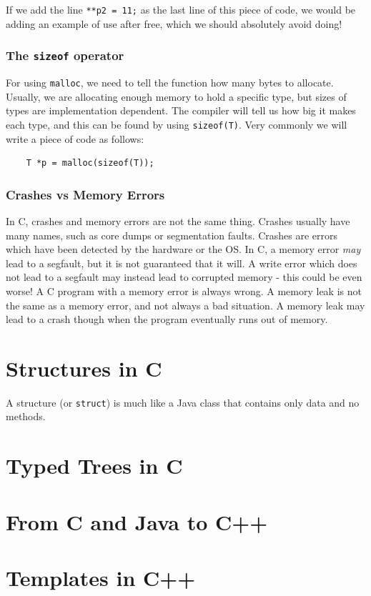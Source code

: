 \documentclass{article}
\begin{document}
	If we add the line \texttt{**p2 = 11;} as the last line of this piece of code, we would be adding an example of use after free, which we should absolutely avoid doing!
	
	\subsubsection{The \texttt{sizeof} operator}
	For using \texttt{malloc}, we need to tell the function how many bytes to allocate. Usually, we are allocating enough memory to hold a specific type, but sizes of types are implementation dependent. The compiler will tell us how big it makes each type, and this can be found by using \texttt{sizeof(T)}. Very commonly we will write a piece of code as follows:
	
	\begin{verbatim}
	T *p = malloc(sizeof(T));
	\end{verbatim}
	
	\subsubsection{Crashes vs Memory Errors}
	In C, crashes and memory errors are not the same thing. Crashes usually have many names, such as core dumps or segmentation faults. Crashes are errors which have been detected by the hardware or the OS. In C, a memory error \textit{may} lead to a segfault, but it is not guaranteed that it will. A write error which does not lead to a segfault may instead lead to corrupted memory - this could be even worse! A C program with a memory error is always wrong. A memory leak is not the same as a memory error, and not always a bad situation. A memory leak may lead to a crash though when the program eventually runs out of memory.
	
	\section{Structures in C}
	A structure (or \texttt{struct}) is much like a Java class that contains only data and no methods.	
	
	\section{Typed Trees in C}

	\section{From C and Java to C++}
	
	\section{Templates in C++}
		
	\newpage
	\listoffigures
	\printindex
\end{document}
